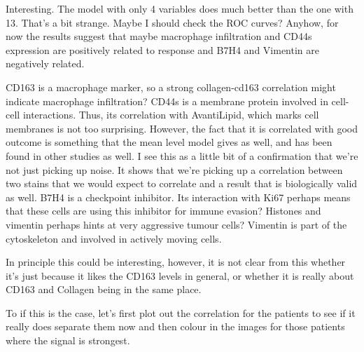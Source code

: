 \documentclass[a4paper]{article}\usepackage[]{graphicx}\usepackage[]{color}
\begin{document}
Interesting. The model with only 4 variables does much better than the one with 13. That's a bit strange. Maybe I should check the ROC curves? Anyhow, for now the results suggest that maybe macrophage infiltration and CD44s expression are positively related to response and B7H4 and Vimentin are negatively related. 

CD163 is a macrophage marker, so a strong collagen-cd163 correlation might indicate macrophage infiltration? 
CD44s is a membrane protein involved in cell-cell interactions. Thus, its correlation with AvantiLipid, which marks cell membranes is not too surprising. However, the fact that it is correlated with good outcome is something that the mean level model gives as well, and has been found in other studies as well. I see this as a little bit of a confirmation that we’re not just picking up noise. It shows that we’re picking up a correlation between two stains that we would expect to correlate and a result that is biologically valid as well.
B7H4 is a checkpoint inhibitor. Its interaction with Ki67 perhaps means that these cells are using this inhibitor for immune evasion?
Histones and vimentin perhaps hints at very aggressive tumour cells? Vimentin is part of the cytoskeleton and involved in actively moving cells.


In principle this could be interesting, however, it is not clear from this whether it's just because it likes the CD163 levels in general, or whether it is really about CD163 and Collagen being in the same place.

To if this is the case, let's first plot out the correlation for the patients to see if it really does separate them now and then colour in the images for those patients where the signal is strongest.
\end{document}
